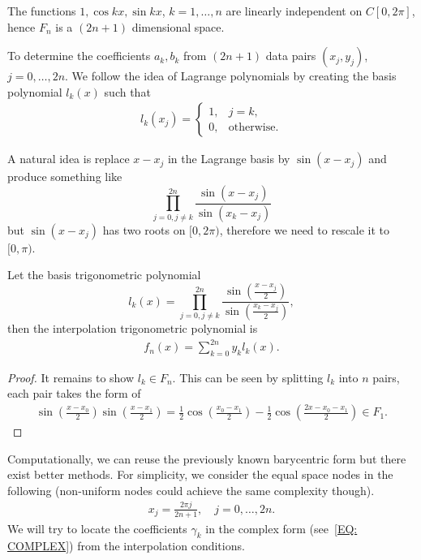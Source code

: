 \begin{corollary}
\label{Cor: 2-Fou-bas-ind}
    The functions $1, \cos kx, \sin kx$, $k=1,\dots, n$ are linearly independent on $C [0, 2\pi]$, hence $F_n$ is a $(2n+1)$ dimensional space.
\end{corollary}
To determine the coefficients $a_k, b_k$ from $(2n+1)$ data pairs $(x_j, y_j)$, $j=0, \dots, 2n$. We follow the idea of Lagrange polynomials by creating the basis polynomial $l_k(x)$ such that
\begin{eqnarray}
    l_k(x_j) = \begin{cases}
        1, &j = k,\\
        0,&\text{otherwise}.
    \end{cases} 
\end{eqnarray}
\begin{remark}
    A natural idea is replace $x - x_j$ in the Lagrange basis by $\sin(x - x_j)$ and produce something like 
$$\prod_{j=0, j\neq k}^{2n}\frac{\sin(x - x_j)}{\sin(x_k - x_j)}$$
but $\sin(x - x_j)$ has two roots on $[0, 2\pi)$, therefore we need to rescale it to $[0, \pi)$.
\end{remark}
\begin{theorem}
\label{Thm: 2-Tri-Lag}
    Let the basis trigonometric polynomial 
    $$l_k(x) =\prod_{j=0, j\neq k}^{2n}\frac{\sin(\frac{x - x_j}{2})}{\sin(\frac{x_k - x_j}{2})} ,$$
    then the interpolation trigonometric polynomial is 
    \begin{eqnarray}
        f_n(x) = \sum_{k=0}^{2n} y_k l_k(x).
    \end{eqnarray}
\end{theorem}
\begin{proof}
    It remains to show $l_k\in F_n$. This can be seen by splitting $l_k$ into $n$ pairs, each pair takes the form of 
    \begin{eqnarray}
        \sin(\frac{x-x_0}{2})\sin(\frac{x-x_1}{2}) = \frac{1}{2}\cos\left( \frac{x_0 - x_1}{2}\right) - \frac{1}{2}\cos\left(\frac{2x - x_0 - x_1}{2}\right)\in F_1.
    \end{eqnarray}
\end{proof}
Computationally, we can reuse the previously known barycentric form but there exist better methods. For simplicity, we consider the equal space nodes in the following (non-uniform nodes could achieve the same complexity though). 
\begin{eqnarray}
    x_j = \frac{2\pi j}{2n + 1}, \quad j = 0, \dots, 2n. 
\end{eqnarray}
We will try to locate the coefficients $\gamma_k$ in the complex form (see~\eqref{EQ: COMPLEX}) from the interpolation conditions.

